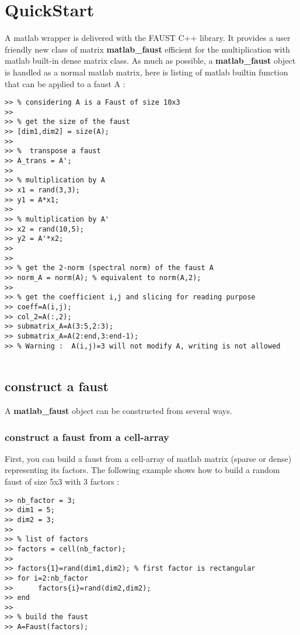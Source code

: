 \chapter{QuickStart}\label{sec:firstUse}


A matlab wrapper is delivered with the FAUST C++ library.
It provides a user friendly new class of matrix \textbf{matlab{\_}faust} efficient for the multiplication with matlab built-in dense matrix class.\newline
\newline
As much as possible, a \textbf{matlab{\_}faust} object is handled as a normal matlab matrix, here is listing of matlab builtin function that can be applied to a faust A :



\begin{lstlisting}
>> % considering A is a Faust of size 10x3
>>
>> % get the size of the faust
>> [dim1,dim2] = size(A);
>>
>> %  transpose a faust  
>> A_trans = A'; 		 
>> 
>> % multiplication by A
>> x1 = rand(3,3);
>> y1 = A*x1;  
>> 
>> % multiplication by A'
>> x2 = rand(10,5);
>> y2 = A'*x2;
>>
>>
>> % get the 2-norm (spectral norm) of the faust A
>> norm_A = norm(A); % equivalent to norm(A,2);
>>
>> % get the coefficient i,j and slicing for reading purpose
>> coeff=A(i,j);
>> col_2=A(:,2);
>> submatrix_A=A(3:5,2:3);
>> submatrix_A=A(2:end,3:end-1);
>> % Warning :  A(i,j)=3 will not modify A, writing is not allowed
  
\end{lstlisting}



\section{construct a faust}\label{sec:firstUseBuild}

A \textbf{matlab{\_}faust} object can be constructed from several ways.
\subsection{construct a faust from a cell-array}\label{sec:firstUseBuildFromCellArray}
First, you can build a faust from a cell-array of matlab matrix (sparse or dense) representing its factors.
\newline
\newline
The following example shows how to build a random faust of size 5x3 with 3 factors :
\begin{lstlisting}
>> nb_factor = 3;
>> dim1 = 5;
>> dim2 = 3; 
>>
>> % list of factors
>> factors = cell(nb_factor);
>>
>> factors{1}=rand(dim1,dim2); % first factor is rectangular 
>> for i=2:nb_factor
>> 		factors{i}=rand(dim2,dim2);
>> end
>>
>> % build the faust
>> A=Faust(factors);
\end{lstlisting}
\newpage

